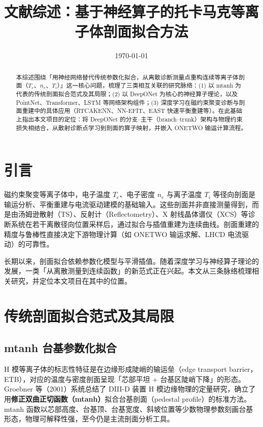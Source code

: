 \documentclass[12pt,a4paper]{article}
\title{\bfseries 文献综述：基于神经算子的托卡马克等离子体剖面拟合方法}
\author{}
\date{\today}
\begin{document}
\maketitle

\begin{abstract}
\noindent 本综述围绕「用神经网络替代传统参数化拟合，从离散诊断测量点重构连续等离子体剖面（$T_e$、$n_e$、$T_i$）」这一核心问题，梳理了三类相互关联的研究脉络：(1) 以 mtanh 为代表的传统剖面拟合范式及其局限；(2) 以 DeepONet 为核心的神经算子理论，以及 PointNet、Transformer、LSTM 等网络架构组件；(3) 深度学习在磁约束聚变诊断与剖面重建中的具体应用（RTCAKENN、NN-EFIT、EAST 快速平衡重建等）。在此基础上指出本文项目的定位：将 DeepONet 的分支--主干（branch--trunk）架构与物理约束损失相结合，从散射诊断点学习到剖面的算子映射，并嵌入 ONETWO 输运计算流程。
\end{abstract}

\section{引言}

磁约束聚变等离子体中，电子温度 $T_e$、电子密度 $n_e$ 与离子温度 $T_i$ 等径向剖面是输运分析、平衡重建与电流驱动建模的基础输入。这些剖面并非直接测量得到，而是由汤姆逊散射（TS）、反射计（Reflectometry）、X 射线晶体谱仪（XCS）等诊断系统在若干离散径向位置采样后，通过拟合与插值重建为连续曲线。剖面重建的精度与鲁棒性直接决定下游物理计算（如 ONETWO 输运求解、LHCD 电流驱动）的可靠性。

长期以来，剖面拟合依赖参数化模型与平滑插值。随着深度学习与神经算子理论的发展，一类「从离散测量到连续函数」的新范式正在兴起。本文从三条脉络梳理相关研究，并定位本文项目在其中的位置。

\section{传统剖面拟合范式及其局限}

\subsection{mtanh 台基参数化拟合}

H 模等离子体的标志性特征是在边缘形成陡峭的输运垒（edge transport barrier，ETB），对应的温度与密度剖面呈现「芯部平坦 + 台基区陡峭下降」的形态。Groebner 等（2001）系统总结了 DIII-D 装置 H 模边缘物理的定量研究，确立了用\textbf{修正双曲正切函数（mtanh）}拟合台基剖面（pedestal profile）的标准方法。mtanh 函数以芯部高度、台基顶、台基宽度、斜坡位置等少数物理参数刻画台基形态，物理可解释性强，至今仍是主流剖面分析工具。
\end{document}
